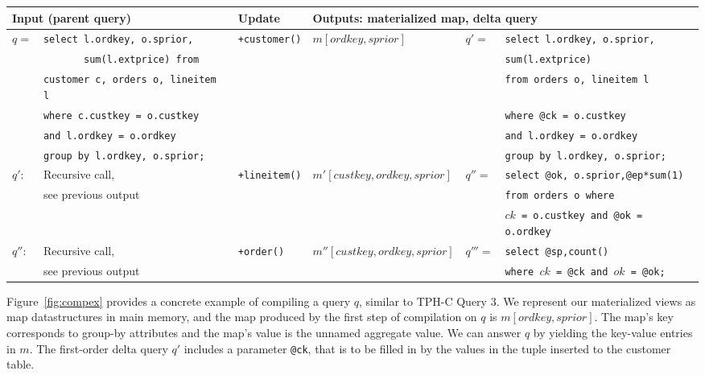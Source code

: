 \def \sql#1{{\scriptsize {\tt #1}}}
\begin{figure*}[htbp]
\begin{tabular}{ll|l|l|ll}
\multicolumn{2}{l}{Input (parent query)}
& Update 
& \multicolumn{3}{l}{Outputs: materialized map, delta query}
\\
\hline
$q =$
& \sql{select l.ordkey, o.sprior,}
& \texttt{+customer()}
& $m[ordkey,sprior]$
& $q' =$
& \sql{select l.ordkey, o.sprior,}
\\
& \sql{\ \ \ \ \ \ \ sum(l.extprice) from}
& & & & \sql{sum(l.extprice)}
\\
& \sql{customer c, orders o, lineitem l}
& & & & \sql{from orders o, lineitem l}
\\
& \sql{where c.custkey = o.custkey}
& & & & \sql{where @ck = o.custkey} 
\\
& \sql{and l.ordkey = o.ordkey}
& & & & \sql{and l.ordkey = o.ordkey}
\\
& \sql{group by l.ordkey, o.sprior;}
& & & & \sql{group by l.ordkey, o.sprior;}
\\
\hline
$q'$:
& Recursive call,
& \texttt{+lineitem()} 
& $m'[custkey,ordkey,sprior]$
& $q'' =$ & \sql{select @ok, o.sprior,@ep*sum(1)}
\\
& see previous output
& & & & \sql{from orders o where}
\\
& & & & & \sql{$ck$ = o.custkey and @ok = o.ordkey}
\\
\hline
$q''$:
& Recursive call,
& \texttt{+order()} 
& $m''[custkey,ordkey,sprior]$
& $q'''=$ & \sql{select @sp,count()}
\\
& see previous output
& & & & \sql{where $ck$ = @ck and $ok$ = @ok;}
\end{tabular}
\caption{Recursive query compilation example. Given a query $q$, we determine a
sequence of materializations, and delta queries for maintenance:
$\tuple{m,q'}, \tuple{m',q''}, \tuple{m'',q'''}$. This is a partial compilation
trace, our algorithm considers all permutations of updates.}
\label{fig:compex}
\end{figure*}


Figure~\ref{fig:compex} provides a concrete example of compiling a query $q$,
similar to TPH-C Query 3. We represent our materialized views as map
datastructures in main memory, and the map produced by the first step of
compilation on $q$ is $m[ordkey,sprior]$. The map's key corresponds to group-by
attributes and the map's value is the unnamed aggregate value. We can answer $q$
by yielding the key-value entries in $m$. The first-order delta query $q'$
includes a parameter {\tt @ck}, that is to be filled in by the values in
the tuple inserted to the customer table.

